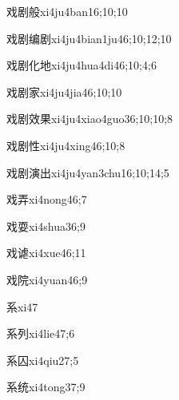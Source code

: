 \begin{verbete}{戏剧般}{xi4ju4ban1}{6;10;10}
\end{verbete}
\begin{verbete}{戏剧编剧}{xi4ju4bian1ju4}{6;10;12;10}
\end{verbete}
\begin{verbete}{戏剧化地}{xi4ju4hua4di4}{6;10;4;6}
\end{verbete}
\begin{verbete}{戏剧家}{xi4ju4jia4}{6;10;10}
\end{verbete}
\begin{verbete}{戏剧效果}{xi4ju4xiao4guo3}{6;10;10;8}
\end{verbete}
\begin{verbete}{戏剧性}{xi4ju4xing4}{6;10;8}
\end{verbete}
\begin{verbete}{戏剧演出}{xi4ju4yan3chu1}{6;10;14;5}
\end{verbete}
\begin{verbete}{戏弄}{xi4nong4}{6;7}
\end{verbete}
\begin{verbete}{戏耍}{xi4shua3}{6;9}
\end{verbete}
\begin{verbete}{戏谑}{xi4xue4}{6;11}
\end{verbete}
\begin{verbete}{戏院}{xi4yuan4}{6;9}
\end{verbete}
\begin{verbete}{系}{xi4}{7}
\end{verbete}
\begin{verbete}{系列}{xi4lie4}{7;6}
\end{verbete}
\begin{verbete}{系囚}{xi4qiu2}{7;5}
\end{verbete}
\begin{verbete}{系统}{xi4tong3}{7;9}
\end{verbete}
